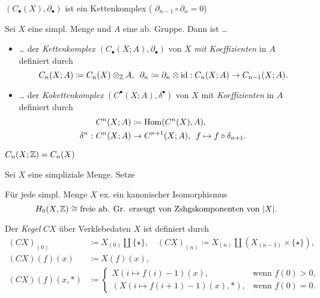 \documentclass{cheat-sheet}
\begin{document}
\begin{prop}
  $(C_\bullet(X),\partial_\bullet)$ ist ein Kettenkomplex (\dh{} $\partial_{n-1} \circ \partial_n = 0$)
\end{prop}

\begin{defn}
  Sei $X$ eine simpl. Menge und $A$ eine ab. Gruppe. Dann ist \ldots
  \begin{itemize}
    \item \ldots{} der \emph{Kettenkomplex} $(C_\bullet(X; A), \partial_\bullet)$ von $X$ \emph{mit Koeffizienten} in $A$ definiert durch
    \[
      C_n(X; A) \coloneqq C_n(X) \otimes_{\mathbb{Z}} A, \enspace
      \partial_n \coloneqq \partial_n \otimes \operatorname{id} : C_n(X; A) \to C_{n-1}(X; A).
    \]
    \item \ldots{} der \emph{Kokettenkomplex} $(C^\bullet(X; A), \delta^\bullet)$ von $X$ mit \emph{Koeffizienten} in $A$ definiert durch
    \begin{align*}
      & C^n(X; A) \coloneqq \operatorname{Hom}(C^n(X), A), \\
      \delta^n : \,\, & C^n(X; A) \to C^{n+1}(X; A), \enspace f \mapsto f \circ \delta_{n+1}.
    \end{align*}
  \end{itemize}
\end{defn}

\begin{beob}
  $C_n(X; \mathbb{Z}) = C_n(X)$
\end{beob}

\begin{nota}
  Sei $X$ eine simpliziale Menge. Setze
  \begin{itemize}
  \end{itemize}
\end{nota}

\begin{prop}
  Für jede simpl. Menge $X$ ex. ein kanonischer Isomorphismus
  \[ H_0(X, \mathbb{Z}) \cong \text{freie ab. Gr. erzeugt von Zshgskomponenten von $\lvert X\rvert$}. \]
\end{prop}

\begin{defn}
  Der \emph{Kegel} $CX$ über Verklebedaten $X$ ist definiert durch
  \begin{align*}
    (CX)_{(0)} & \coloneqq X_{(0)} \amalg \{ \star \}, \quad (CX)_{(n)} \coloneqq X_{(n)} \amalg (X_{(n-1)} \times \{ \star \}), \\
    (CX)(f)(x) & \coloneqq X(f)(x), \\
    (CX)(f)(x,*) &  \coloneqq \begin{cases}
      X(i \mapsto f(i) - 1)(x), & \text{wenn $f(0) > 0$,} \\
      (X(i \mapsto f(i{+}1) - 1)(x), *), & \text{wenn $f(0) = 0$.}
    \end{cases}
  \end{align*}
\end{defn}
\end{document}
